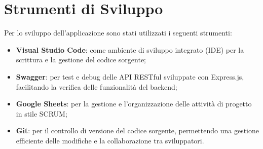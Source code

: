 \section{Strumenti di Sviluppo}
Per lo sviluppo dell'applicazione sono stati utilizzati i seguenti strumenti:
\begin{itemize}
    \item \textbf{Visual Studio Code}: come ambiente di sviluppo integrato (IDE) per la scrittura e la gestione del codice sorgente;
    \item \textbf{Swagger}: per test e debug delle API RESTful sviluppate con Express.js, facilitando la verifica delle funzionalità del backend;
    \item \textbf{Google Sheets}: per la gestione e l'organizzazione delle attività di progetto in stile SCRUM;
    \item \textbf{Git}: per il controllo di versione del codice sorgente, permettendo una gestione efficiente delle modifiche e la collaborazione tra sviluppatori.
\end{itemize}
